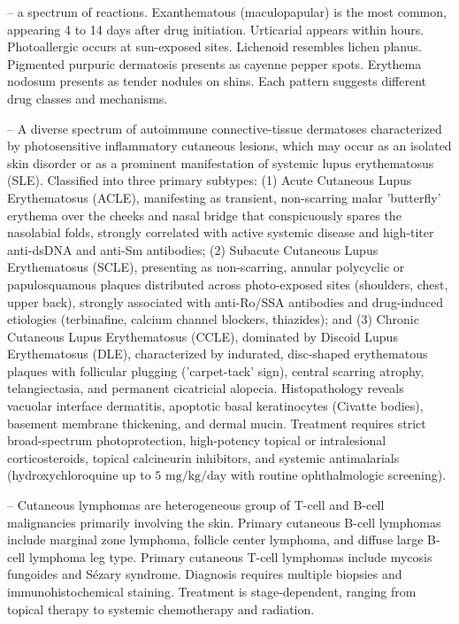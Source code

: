 -- a spectrum of reactions. Exanthematous (maculopapular) is the most common, appearing 4 to 14 days after drug initiation. Urticarial appears within hours. Photoallergic occurs at sun-exposed sites. Lichenoid resembles lichen planus. Pigmented purpuric dermatosis presents as cayenne pepper spots. Erythema nodosum presents as tender nodules on shins. Each pattern suggests different drug classes and mechanisms.

-- A diverse spectrum of autoimmune connective-tissue dermatoses characterized by photosensitive inflammatory cutaneous lesions, which may occur as an isolated skin disorder or as a prominent manifestation of systemic lupus erythematosus (SLE). Classified into three primary subtypes: (1) Acute Cutaneous Lupus Erythematosus (ACLE), manifesting as transient, non-scarring malar 'butterfly' erythema over the cheeks and nasal bridge that conspicuously spares the nasolabial folds, strongly correlated with active systemic disease and high-titer anti-dsDNA and anti-Sm antibodies; (2) Subacute Cutaneous Lupus Erythematosus (SCLE), presenting as non-scarring, annular polycyclic or papulosquamous plaques distributed across photo-exposed sites (shoulders, chest, upper back), strongly associated with anti-Ro/SSA antibodies and drug-induced etiologies (terbinafine, calcium channel blockers, thiazides); and (3) Chronic Cutaneous Lupus Erythematosus (CCLE), dominated by Discoid Lupus Erythematosus (DLE), characterized by indurated, disc-shaped erythematous plaques with follicular plugging ('carpet-tack' sign), central scarring atrophy, telangiectasia, and permanent cicatricial alopecia. Histopathology reveals vacuolar interface dermatitis, apoptotic basal keratinocytes (Civatte bodies), basement membrane thickening, and dermal mucin. Treatment requires strict broad-spectrum photoprotection, high-potency topical or intralesional corticosteroids, topical calcineurin inhibitors, and systemic antimalarials (hydroxychloroquine up to $5\text{ mg/kg/day}$ with routine ophthalmologic screening).

-- Cutaneous lymphomas are heterogeneous group of T-cell and B-cell malignancies primarily involving the skin. Primary cutaneous B-cell lymphomas include marginal zone lymphoma, follicle center lymphoma, and diffuse large B-cell lymphoma leg type. Primary cutaneous T-cell lymphomas include mycosis fungoides and Sézary syndrome. Diagnosis requires multiple biopsies and immunohistochemical staining. Treatment is stage-dependent, ranging from topical therapy to systemic chemotherapy and radiation.

